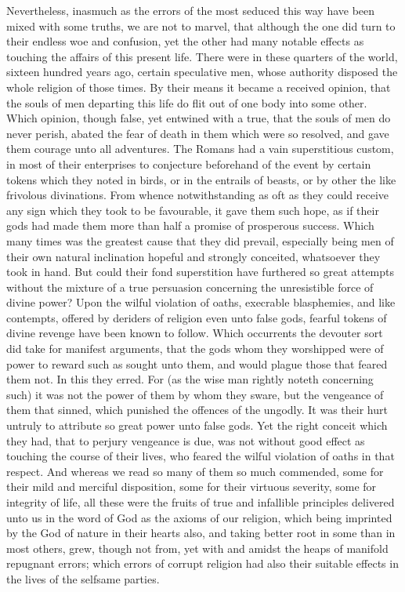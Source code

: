 Nevertheless, inasmuch as the errors of the most seduced this way have been mixed with some truths, we are not to marvel, that although the one did turn to their endless woe and confusion, yet the other had many notable effects as touching the affairs of this present life. There were in these quarters of the world, sixteen hundred years ago, certain speculative men, whose authority disposed the whole religion of those times. By their means it became a received opinion, that the souls of men departing this life do flit out of one body into some other. Which opinion, though false, yet entwined with a true, that the souls of men do never perish, abated the fear of death in them which were so resolved, and gave them courage unto all adventures.
The Romans had a vain superstitious custom, in most of their enterprises to conjecture beforehand of the event by certain tokens which they noted in birds, or in the entrails of beasts, or by other the like frivolous divinations. From whence notwithstanding as oft as they could receive any sign which they took to be favourable, it gave them such hope, as if their gods had made them more than half a promise of prosperous success. Which many times was the greatest cause that they did prevail, especially being men of their own natural inclination hopeful and strongly conceited, whatsoever they took in hand. But could their fond superstition have furthered so great attempts without the mixture of a true persuasion concerning the unresistible force of divine power?
Upon the wilful violation of oaths, execrable blasphemies, and like contempts, offered by deriders of religion even unto false gods, fearful tokens of divine revenge have been known to follow. Which occurrents the devouter sort did take for manifest arguments, that the gods whom they worshipped were of power to reward such as sought unto them, and would plague those that feared them not. In this they erred. For (as the wise man rightly noteth concerning such) it was not the power of them by whom they sware, but the vengeance of them that sinned, which punished the offences of the ungodly. It was their hurt untruly to attribute so great power  unto false gods. Yet the right conceit which they had, that to perjury vengeance is due, was not without good effect as touching the course of their lives, who feared the wilful violation of oaths in that respect.
And whereas we read so many of them so much commended, some for their mild and merciful disposition, some for their virtuous severity, some for integrity of life, all these were the fruits of true and infallible principles delivered unto us in the word of God as the axioms of our religion, which being imprinted by the God of nature in their hearts also, and taking better root in some than in most others, grew, though not from, yet with and amidst the heaps of manifold repugnant errors; which errors of corrupt religion had also their suitable effects in the lives of the selfsame parties.
